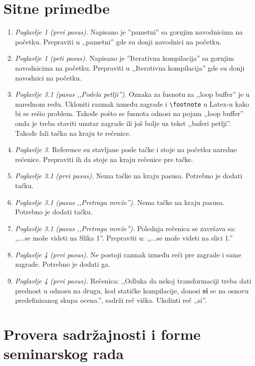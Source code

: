 \documentclass[a4paper]{report}
\begin{document}
\section{Sitne primedbe}
\begin{enumerate}
	\item \textit{Poglavlje 1 (prvi pasus).} Napisano je ''pametni'' sa gornjim navodnicima na početku. Prepraviti u ,,pametni'' gde su donji navodnici na početku.
	\item \textit{Poglavlje 1 (peti pasus).} Napisano je ''Iterativna kompilacija'' sa gornjim navodnicima na početku. Prepraviti u ,,Iterativna kompilacija'' gde su donji navodnici na početku.
	\item \textit{Poglavlje 3.1 (pasus ,,Podela petlji'').} Oznaka za fusnotu za ,,loop buffer'' je u narednom redu. Ukloniti razmak između zagrade i \verb!\footnote! u Latex-u kako bi se rešio problem. Takođe pošto se fusnota odnosi na pojam ,,loop buffer'' onda je treba staviti unutar zagrade ili još bolje uz tekst ,,baferi petlji''. Takođe fali tačka na kraju te rečenice.
	\item \textit{Poglavlje 3.} Reference su stavljane posle tačke i stoje na početku naredne rečenice. Prepraviti ih da stoje na kraju rečenice pre tačke.
	\item \textit{Poglavlje 3.1 (prvi pasus).} Nema tačke na kraju pasusa. Potrebno je dodati tačku.
	\item \textit{Poglavlje 3.1 (pasus ,,Pretraga mreže'').} Nema tačke na kraju pasusa. Potrebno je dodati tačku.
	\item \textit{Poglavlje 3.1 (pasus ,,Pretraga mreže'').} Polednja rečenica se završava sa: ,,...se može videti na Slika 1''. Prepraviti u: ,,...se može videti na slici 1.''
	\item \textit{Poglavlje 4 (prvi pasus).} Ne postoji razmak između reči pre zagrade i same zagrade. Potrebno je dodati ga.
	\item \textit{Poglavlje 4 (prvi pasus).} Rečenica: ,,Odluka da nekoj transformaciji treba dati prednost u odnosu na drugu, kod statičke kompilacije, donosi \textbf{si} se na osnovu predefinisanog skupa ocena.'', sadrži reč viška. Ukolinti reč ,,si''.
\end{enumerate}

\section{Provera sadržajnosti i forme seminarskog rada}
\end{document}
